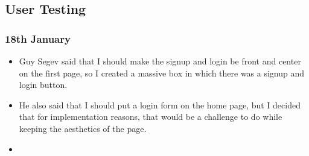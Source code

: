 \subsection{User Testing}

\subsubsection{18th January}
\begin{itemize}
    \item Guy Segev said that I should make the signup and login be front and center on the first page, so I created a massive box in which there was a signup and login button.
    \item He also said that I should put a login form on the home page, but I decided that for implementation reasons, that would be a challenge to do while keeping the aesthetics of the page.
    \item 
\end{itemize}